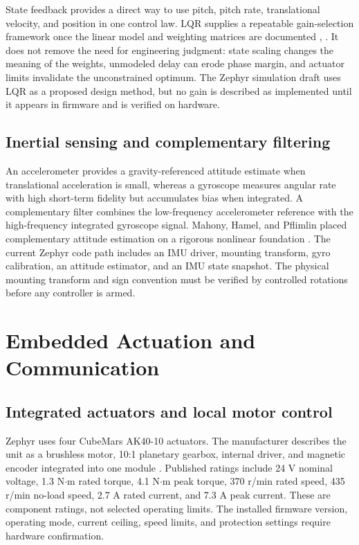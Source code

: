 State feedback provides a direct way to use pitch, pitch rate,
translational velocity, and position in one control law. LQR supplies a
repeatable gain-selection framework once the linear model and weighting
matrices are documented \cite{astrom2008feedback}, \cite{anderson1990optimal}. It does not remove the need
for engineering judgment: state scaling changes the meaning of the
weights, unmodeled delay can erode phase margin, and actuator limits
invalidate the unconstrained optimum. The Zephyr simulation draft uses
LQR as a proposed design method, but no gain is described as implemented
until it appears in firmware and is verified on hardware.

\subsection{Inertial sensing and complementary filtering}\label{inertial-sensing-and-complementary-filtering}

An accelerometer provides a gravity-referenced attitude estimate when
translational acceleration is small, whereas a gyroscope measures
angular rate with high short-term fidelity but accumulates bias when
integrated. A complementary filter combines the low-frequency
accelerometer reference with the high-frequency integrated gyroscope
signal. Mahony, Hamel, and Pflimlin placed complementary attitude
estimation on a rigorous nonlinear foundation \cite{mahony2008filters}. The current
Zephyr code path includes an IMU driver, mounting transform, gyro
calibration, an attitude estimator, and an IMU state snapshot. The
physical mounting transform and sign convention must be verified by
controlled rotations before any controller is armed.

\section{Embedded Actuation and Communication}\label{embedded-actuation-and-communication}

\subsection{Integrated actuators and local motor control}\label{integrated-actuators-and-local-motor-control}

Zephyr uses four CubeMars AK40-10 actuators. The manufacturer describes
the unit as a brushless motor, 10:1 planetary gearbox, internal driver,
and magnetic encoder integrated into one module \cite{cubemars2026ak4010}. Published
ratings include 24 V nominal voltage, 1.3 N\ensuremath{\cdot}m rated torque, 4.1 N\ensuremath{\cdot}m peak
torque, 370 r\slash{}min rated speed, 435 r\slash{}min no-load speed, 2.7 A rated
current, and 7.3 A peak current. These are component ratings, not
selected operating limits. The installed firmware version, operating
mode, current ceiling, speed limits, and protection settings require
hardware confirmation.

